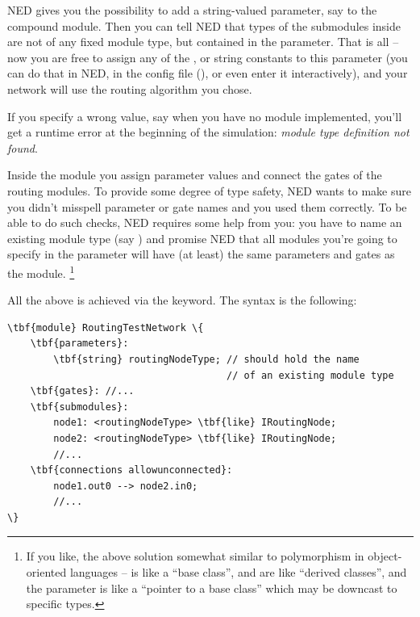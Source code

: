 NED gives you the possibility to add a string-valued parameter,
say  to the  compound module.
Then you can tell NED that types of the submodules inside 
are not of any fixed module type, but contained in the 
parameter. That is all -- now you are free to assign any of
the ,  or
 string constants to this parameter
(you can do that in NED, in the config file (),
or even enter it interactively),
and your network will use the routing algorithm you chose.

If you specify a wrong value, say 
when you have no  module implemented,
you'll get a runtime error at the beginning of the simulation:
\textit{module type definition not found}.

Inside the  module you assign parameter values
and connect the gates of the routing modules. To provide some degree
of type safety, NED wants to make sure you didn't misspell
parameter or gate names and you used them correctly.
To be able to do such checks, NED requires some help from you:
you have to name an existing module type (say )
and promise NED that all modules you're going to specify
in the  parameter will have (at least) the same
parameters and gates as the  module.
  \footnote{If you like, the above solution somewhat similar to polymorphism
  in object-oriented languages --  is like a
  ``base class'',  and 
  are like ``derived classes'', and the  parameter
  is like a ``pointer to a base class'' which may be downcast to specific
  types.}

All the above is achieved via the  keyword.
The syntax is the following:

\begin{Verbatim}[commandchars=\\\{\}]
\tbf{module} RoutingTestNetwork \{
    \tbf{parameters}:
        \tbf{string} routingNodeType; // should hold the name
                                      // of an existing module type
    \tbf{gates}: //...
    \tbf{submodules}:
        node1: <routingNodeType> \tbf{like} IRoutingNode;
        node2: <routingNodeType> \tbf{like} IRoutingNode;
        //...
    \tbf{connections allowunconnected}:
        node1.out0 --> node2.in0;
        //...
\}
\end{Verbatim}

